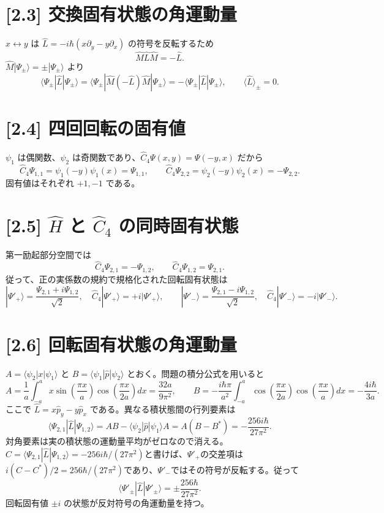 \documentclass[11pt,a4paper]{article}
\begin{document}
\section*{[2.3] 交換固有状態の角運動量}
$x\leftrightarrow y$ は $\hat L=-i\hbar(x\partial_y-y\partial_x)$ の符号を反転するため
\[
\hat M\hat L\hat M=-\hat L.
\]
$\hat M|\Psi_\pm\rangle=\pm|\Psi_\pm\rangle$ より
\[
\langle\Psi_\pm|\hat L|\Psi_\pm\rangle
=\langle\Psi_\pm|\hat M(-\hat L)\hat M|\Psi_\pm\rangle
=-\langle\Psi_\pm|\hat L|\Psi_\pm\rangle,
\qquad \boxed{\langle\hat L\rangle_\pm=0}.
\]

\section*{[2.4] 四回回転の固有値}
$\psi_1$ は偶関数、$\psi_2$ は奇関数であり、$\hat C_4\Psi(x,y)=\Psi(-y,x)$ だから
\[
\hat C_4\Psi_{1,1}=\psi_1(-y)\psi_1(x)=\Psi_{1,1},\qquad
\hat C_4\Psi_{2,2}=\psi_2(-y)\psi_2(x)=-\Psi_{2,2}.
\]
固有値はそれぞれ $+1,-1$ である。

\section*{[2.5] $\hat H$ と $\hat C_4$ の同時固有状態}
第一励起部分空間では
\[
\hat C_4\Psi_{2,1}=-\Psi_{1,2},\qquad \hat C_4\Psi_{1,2}=\Psi_{2,1}.
\]
従って、正の実係数の規約で規格化された回転固有状態は
\[
\boxed{|\Psi'_+\rangle=\frac{\Psi_{2,1}+i\Psi_{1,2}}{\sqrt2},\quad \hat C_4|\Psi'_+\rangle=+i|\Psi'_+\rangle},\qquad
\boxed{|\Psi'_-\rangle=\frac{\Psi_{2,1}-i\Psi_{1,2}}{\sqrt2},\quad \hat C_4|\Psi'_-\rangle=-i|\Psi'_-\rangle}.
\]

\section*{[2.6] 回転固有状態の角運動量}
$A=\langle\psi_2|x|\psi_1\rangle$ と $B=\langle\psi_1|\hat p|\psi_2\rangle$ とおく。問題の積分公式を用いると
\[
A=\frac1a\int_{-a}^{a}x\sin\!\left(\frac{\pi x}{a}\right)\cos\!\left(\frac{\pi x}{2a}\right)dx
=\frac{32a}{9\pi^2},\qquad
B=-\frac{i\hbar\pi}{a^2}\int_{-a}^{a}\cos\!\left(\frac{\pi x}{2a}\right)\cos\!\left(\frac{\pi x}{a}\right)dx
=-\frac{4i\hbar}{3a}.
\]
ここで $\hat L=x\hat p_y-y\hat p_x$ である。異なる積状態間の行列要素は
\[
\langle\Psi_{2,1}|\hat L|\Psi_{1,2}\rangle
=A B-\langle\psi_2|\hat p|\psi_1\rangle A
=A(B-B^*)=-\frac{256i\hbar}{27\pi^2}.
\]
対角要素は実の積状態の運動量平均がゼロなので消える。$C=\langle\Psi_{2,1}|\hat L|\Psi_{1,2}\rangle=-256i\hbar/(27\pi^2)$と書けば、$\Psi'_+$の交差項は$i(C-C^*)/2=256\hbar/(27\pi^2)$であり、$\Psi'_-$ではその符号が反転する。従って
\[
\boxed{\langle\Psi'_\pm|\hat L|\Psi'_\pm\rangle=\pm\frac{256\hbar}{27\pi^2}}.
\]
回転固有値 $\pm i$ の状態が反対符号の角運動量を持つ。
\end{document}
